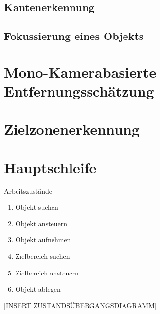\subsection{Kantenerkennung}
\subsection{Fokussierung eines Objekts}

\section{Mono-Kamerabasierte Entfernungsschätzung}

\section{Zielzonenerkennung}


\section{Hauptschleife}

Arbeitszustände
\begin{enumerate}
\item{Objekt suchen}
\item{Objekt ansteuern}
\item{Objekt aufnehmen}
\item{Zielbereich suchen}
\item{Zielbereich ansteuern}
\item{Objekt ablegen}
\end{enumerate}

[INSERT ZUSTANDSÜBERGANGSDIAGRAMM]

